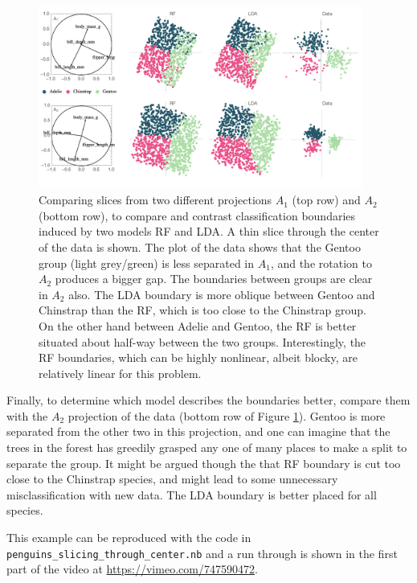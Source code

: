 \documentclass[]{interact}
\theoremstyle{plain}%
\theoremstyle{definition}
\theoremstyle{remark}
\begin{document}
\begin{figure}[ht]
\centerline{\includegraphics[width=0.95\textwidth]{figures/proj2.pdf}}
\caption{Comparing slices from two different projections $A_1$ (top row) and $A_2$ (bottom row), to compare and contrast classification boundaries induced by two models RF and LDA. A thin slice through the center of the data is shown. The plot of the data shows that the Gentoo group (light grey/green) is less separated in $A_1$, and the rotation to $A_2$ produces a bigger gap. The boundaries between groups are clear in $A_2$ also. The LDA boundary is more oblique between Gentoo and Chinstrap than the RF, which is too close to the Chinstrap group. On the other hand between Adelie and Gentoo, the RF is better situated about half-way between the two groups. Interestingly, the RF boundaries, which can be highly nonlinear, albeit blocky, are relatively linear for this problem. }
\label{slice1}
\end{figure}

Finally, to determine which model describes the boundaries better,
compare them with the \(A_2\) projection of the data (bottom row of
Figure \ref{slice1}). Gentoo is more separated from the other two in
this projection, and one can imagine that the trees in the forest has
greedily grasped any one of many places to make a split to separate the
group. It might be argued though the that RF boundary is cut too close
to the Chinstrap species, and might lead to some unnecessary
misclassification with new data. The LDA boundary is better placed for
all species.

This example can be reproduced with the code in
\texttt{penguins\_slicing\_through\_center.nb} and a run through is
shown in the first part of the video at
\url{https://vimeo.com/747590472}.
\end{document}
